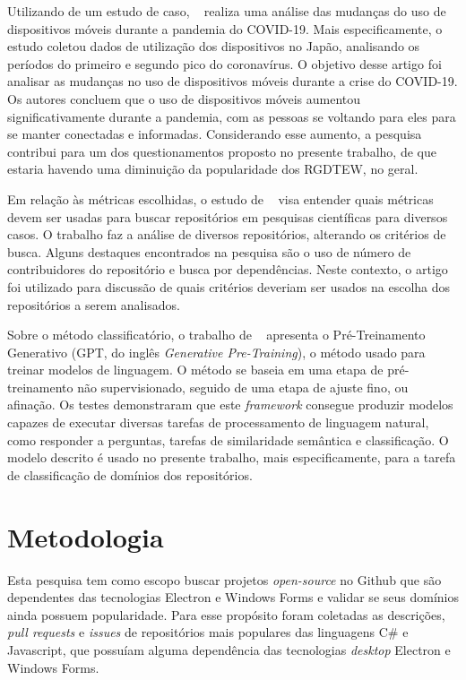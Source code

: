\documentclass[12pt]{article}
\begin{document}
Utilizando de um estudo de caso, ~\cite{KATSUMATA2022100168} realiza uma análise das mudanças do uso de dispositivos móveis durante a pandemia do COVID-19. Mais especificamente, o estudo coletou dados de utilização dos dispositivos no Japão, analisando os períodos do primeiro e segundo pico do coronavírus. O objetivo desse artigo foi analisar as mudanças no uso de dispositivos móveis durante a crise do COVID-19. Os autores concluem que o uso de dispositivos móveis aumentou significativamente durante a pandemia, com as pessoas se voltando para eles para se manter conectadas e informadas. Considerando esse aumento, a pesquisa contribui para um dos questionamentos proposto no presente trabalho, de que estaria havendo uma diminuição da popularidade dos RGDTEW, no geral.

Em relação às métricas escolhidas, o estudo de ~\cite{9282287} visa entender quais métricas devem ser usadas para buscar repositórios em pesquisas científicas para diversos casos. O trabalho faz a análise de diversos repositórios, alterando os critérios de busca. Alguns destaques encontrados na pesquisa são o uso de número de contribuidores do repositório e busca por dependências. Neste contexto, o artigo foi utilizado para discussão de quais critérios deveriam ser usados na escolha dos repositórios a serem analisados.

Sobre o método classificatório, o trabalho de ~\cite{radford2018improving} apresenta o Pré-Treinamento Generativo (GPT, do inglês \textit{Generative Pre-Training}), o método usado para treinar modelos de linguagem. O método se baseia em uma etapa de pré-treinamento não supervisionado, seguido de uma etapa de ajuste fino, ou afinação. Os testes demonstraram que este \textit{framework} consegue produzir modelos capazes de executar diversas tarefas de processamento de linguagem natural, como responder a perguntas, tarefas de similaridade semântica e classificação. O modelo descrito é usado no presente trabalho, mais especificamente, para a tarefa de classificação de domínios dos repositórios.

\section{Metodologia} \label{metodologia}

Esta pesquisa tem como escopo buscar projetos \textit{open-source} no Github que são dependentes das tecnologias Electron e Windows Forms e validar se seus domínios ainda possuem popularidade. Para esse propósito foram coletadas as descrições, \textit{pull requests} e \textit{issues} de repositórios mais populares das linguagens C\# e Javascript, que possuíam alguma dependência das tecnologias \textit{desktop} Electron e Windows Forms. 
\end{document}
